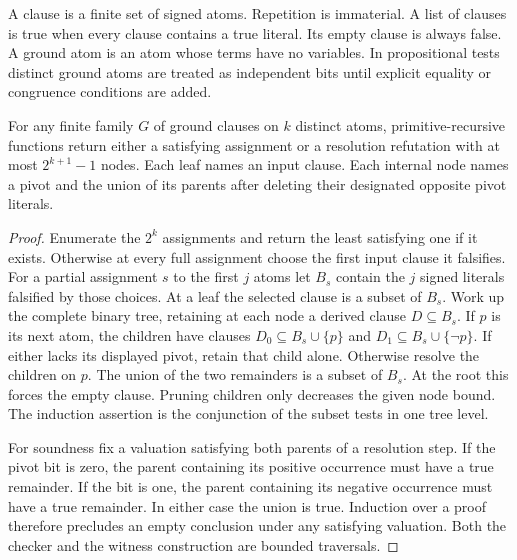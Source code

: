 A clause is a finite set of signed atoms. Repetition is immaterial. A list of clauses is true when every clause contains a true literal. Its empty clause is always false. A ground atom is an atom whose terms have no variables. In propositional tests distinct ground atoms are treated as independent bits until explicit equality or congruence conditions are added.

\begin{theorem}
For any finite family $G$ of ground clauses on $k$ distinct atoms, primitive-recursive functions return either a satisfying assignment or a resolution refutation with at most $2^{k+1}-1$ nodes. Each leaf names an input clause. Each internal node names a pivot and the union of its parents after deleting their designated opposite pivot literals.
\end{theorem}
\begin{proof}
Enumerate the $2^k$ assignments and return the least satisfying one if it exists. Otherwise at every full assignment choose the first input clause it falsifies. For a partial assignment $s$ to the first $j$ atoms let $B_s$ contain the $j$ signed literals falsified by those choices. At a leaf the selected clause is a subset of $B_s$. Work up the complete binary tree, retaining at each node a derived clause $D\subseteq B_s$. If $p$ is its next atom, the children have clauses $D_0\subseteq B_s\cup\{p\}$ and $D_1\subseteq B_s\cup\{\neg p\}$. If either lacks its displayed pivot, retain that child alone. Otherwise resolve the children on $p$. The union of the two remainders is a subset of $B_s$. At the root this forces the empty clause. Pruning children only decreases the given node bound. The induction assertion is the conjunction of the subset tests in one tree level.

For soundness fix a valuation satisfying both parents of a resolution step. If the pivot bit is zero, the parent containing its positive occurrence must have a true remainder. If the bit is one, the parent containing its negative occurrence must have a true remainder. In either case the union is true. Induction over a proof therefore precludes an empty conclusion under any satisfying valuation. Both the checker and the witness construction are bounded traversals.
\end{proof}

